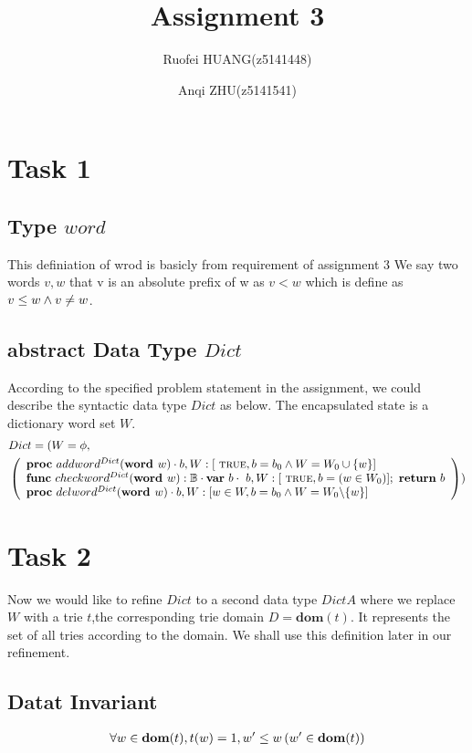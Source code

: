\documentclass[a4paper,12pt,fleqn]{scrartcl}
\title{Assignment 3}
\author{Ruofei HUANG(z5141448)\and
Anqi ZHU(z5141541)
}
\newcommand{\domt}{\textbf{dom}(t)}
\newcommand{\WORD}{\textbf{word }}
\begin{document}
\maketitle
\section{Task 1}
\subsection{Type $word$ }
This definiation of wrod is basicly from requirement of assignment 3
We say two words $ v,w$ that v is an absolute prefix of w as $v < w$ which is 
define as $ v \leq w \wedge v \neq w $.
\subsection{abstract Data Type $Dict$ }
According to the specified problem statement in the assignment, 
we could describe the syntactic data type $Dict$ as below.
The encapsulated state is a dictionary word set $W$.
\begin{align*}
    &Dict = 
    (
        W = \phi,  \\
        &\left( 
            \begin{array}{l}
                \PROC\ addword^{Dict}(\WORD w)\cdot 
                b, W:[ \ \True, b = b_0\And W = W_0\cup \{w\}] \ \\
                \FUNC\ checkword^{Dict}(\WORD w):\mathbb{B}\cdot
                    \VAR\ b\cdot\ b, W:[ \ \True, b = (w\in W_0)];\ 
                    \RETURN\ b\\
                \PROC\ delword^{Dict}(\WORD w)\cdot
                b, W:[ w\in W, b = b_0\And W = W_0 \backslash \{w\}]
            \end{array}
        \right)
    )
\end{align*}
\section{Task 2}
Now we would like to refine $Dict$ to a second data type $DictA$ where we 
replace $W$ with a trie $t$,the corresponding trie domain $D=\domt$.
It represents the set of all tries according to the domain. 
We shall use this definition later in our refinement.\\

\subsection{Datat Invariant} 
\begin{gather*}
    \All{w \in \domt,t(w)= 1, w' \leq w}{w' \in \domt}
\end{gather*}
\end{document}
